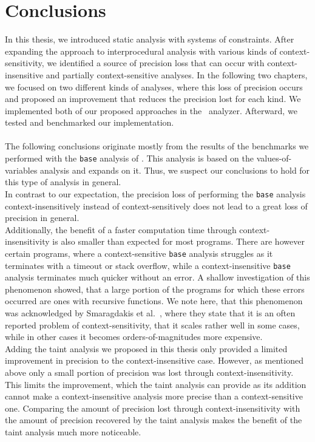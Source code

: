
\chapter{Conclusions}\label{chapter:conclusions}
  In this thesis, we introduced static analysis with systems of constraints. After expanding the approach to interprocedural analysis with various kinds of context-sensitivity, we identified a source of precision loss that can occur with context-insensitive and partially context-sensitive analyses. In the following two chapters, we focused on two different kinds of analyses, where this loss of precision occurs and proposed an improvement that reduces the precision lost for each kind. We implemented both of our proposed approaches in the \gob\ analyzer. Afterward, we tested and benchmarked our implementation.\\
  \\
  The following conclusions originate mostly from the results of the benchmarks we performed with the \texttt{base} analysis of \gob. This analysis is based on the values-of-variables analysis and expands on it. Thus, we suspect our conclusions to hold for this type of analysis in general.\\
  In contrast to our expectation, the precision loss of performing the \texttt{base} analysis context-insensitively instead of context-sensitively does not lead to a great loss of precision in general.\\
  Additionally, the benefit of a faster computation time through context-insensitivity is also smaller than expected for most programs. There are however certain programs, where a context-sensitive \texttt{base} analysis struggles as it terminates with a timeout or stack overflow, while a context-insensitive \texttt{base} analysis terminates much quicker without an error. A shallow investigation of this phenomenon showed, that a large portion of the programs for which these errors occurred are ones with recursive functions. We note here, that this phenomenon was acknowledged by Smaragdakis et al.~\parencite{smaragdakis2014introspective}, where they state that it is an often reported problem of context-sensitivity, that it scales rather well in some cases, while in other cases it becomes orders-of-magnitudes more expensive.\\  
  Adding the taint analysis we proposed in this thesis only provided a limited improvement in precision to the context-insensitive case. However, as mentioned above only a small portion of precision was lost through context-insensitivity. This limits the improvement, which the taint analysis can provide as its addition cannot make a context-insensitive analysis more precise than a context-sensitive one. Comparing the amount of precision lost through context-insensitivity with the amount of precision recovered by the taint analysis makes the benefit of the taint analysis much more noticeable.\\
